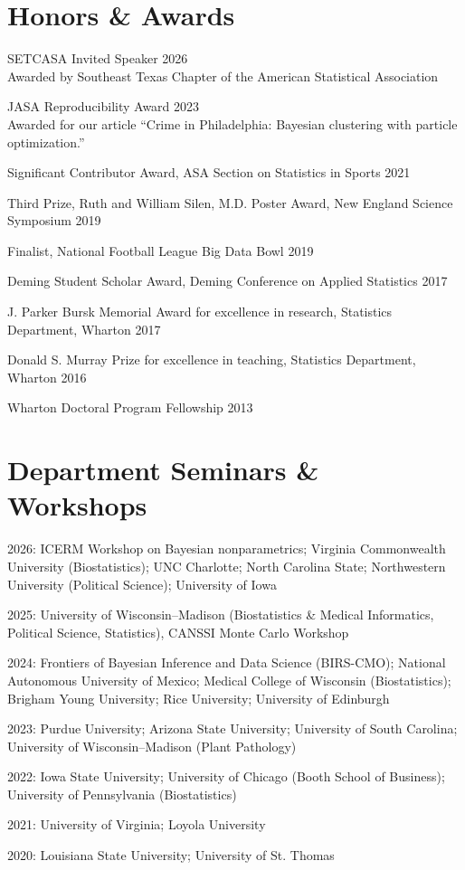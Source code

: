 \documentclass[10pt]{article}
\renewenvironment{itemize}{
  \begin{list}{}{
    \setlength{\leftmargin}{1.5em}
  }
}{
  \end{list}
}
\begin{document}
\section*{Honors \& Awards}
\begin{itemize}
\item{SETCASA Invited Speaker \hfill 2026 \\
Awarded by Southeast Texas Chapter of the American Statistical Association}
\item{JASA Reproducibility Award \hfill 2023 \\
Awarded for our article ``Crime in Philadelphia: Bayesian clustering with particle optimization.''}
\item{Significant Contributor Award, ASA Section on Statistics in Sports \hfill 2021}
\item{Third Prize, Ruth and William Silen, M.D. Poster Award, New England Science Symposium \hfill 2019}
\item{Finalist, National Football League Big Data Bowl \hfill 2019}
\item{Deming Student Scholar Award, Deming Conference on Applied Statistics \hfill 2017}
\item{J. Parker Bursk Memorial Award for excellence in research, Statistics Department, Wharton \hfill  2017}
\item{Donald S. Murray Prize for excellence in teaching, Statistics Department, Wharton \hfill 2016}
\item{Wharton Doctoral Program Fellowship \hfill 2013}
\end{itemize}


\section*{Department Seminars \& Workshops}

\begin{itemize}
\item{2026: ICERM Workshop on Bayesian nonparametrics; Virginia Commonwealth University (Biostatistics); UNC Charlotte; North Carolina State; Northwestern University (Political Science); University of Iowa}
\item{2025: University of Wisconsin--Madison (Biostatistics \& Medical Informatics, Political Science, Statistics), CANSSI Monte Carlo Workshop}
\item{2024: Frontiers of Bayesian Inference and Data Science (BIRS-CMO); National Autonomous University of Mexico; Medical College of Wisconsin (Biostatistics); Brigham Young University; Rice University; University of Edinburgh}
\item{2023: Purdue University; Arizona State University; University of South Carolina; University of Wisconsin--Madison (Plant Pathology)}
\item{2022: Iowa State University; University of Chicago (Booth School of Business); University of Pennsylvania (Biostatistics)}
\item{2021: University of Virginia; Loyola University}
\item{2020: Louisiana State University; University of St. Thomas}
\end{itemize}
\end{document}
